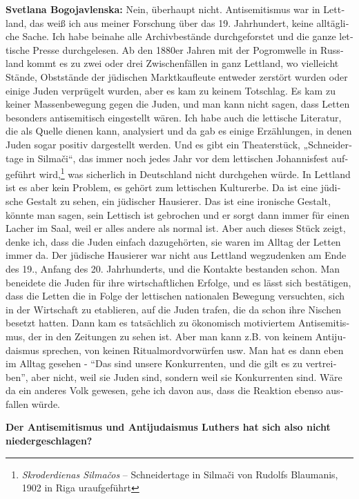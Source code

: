 \begin{otherlanguage}{ngerman}
\textbf{Svetlana Bogojavlenska:} Nein, überhaupt nicht. Antisemitismus war in Lettland, das weiß ich aus meiner Forschung über das 19. Jahrhundert, keine alltägliche Sache. Ich habe beinahe alle Archivbestände durchgeforstet und die ganze lettische Presse durchgelesen. Ab den 1880er Jahren mit der Pogromwelle in Russland kommt es zu zwei oder drei Zwischenfällen in ganz Lettland, wo vielleicht Stände, Obststände der jüdischen Marktkaufleute entweder zerstört wurden oder einige Juden verprügelt wurden, aber es kam zu keinem Totschlag. Es kam zu keiner Massenbewegung gegen die Juden, und man kann nicht sagen, dass Letten besonders antisemitisch eingestellt wären. Ich habe auch die lettische Literatur, die als Quelle dienen kann, analysiert und da gab es einige Erzählungen, in denen Juden sogar positiv dargestellt werden. Und es gibt ein Theaterstück, „Schneidertage in Silmači“, das immer noch jedes Jahr vor dem lettischen Johannisfest aufgeführt wird,\footnote{\textit{Skroderdienas Silmačos} – Schneidertage in Silmači von Rudolfs Blaumanis, 1902 in Riga uraufgeführt} was sicherlich in Deutschland nicht durchgehen würde. In Lettland ist es aber kein Problem, es gehört zum lettischen Kulturerbe. Da ist eine jüdische Gestalt zu sehen, ein jüdischer Hausierer. Das ist eine ironische Gestalt, könnte man sagen, sein Lettisch ist gebrochen und er sorgt dann immer für einen Lacher im Saal, weil er alles andere als normal ist. Aber auch dieses Stück zeigt, denke ich, dass die Juden einfach dazugehörten, sie waren im Alltag der Letten immer da. Der jüdische Hausierer war nicht aus Lettland wegzudenken am Ende des 19., Anfang des 20. Jahrhunderts, und die Kontakte bestanden schon. Man beneidete die Juden für ihre wirtschaftlichen Erfolge, und es lässt sich bestätigen, dass die Letten die in Folge der lettischen nationalen Bewegung versuchten, sich in der Wirtschaft zu etablieren, auf die Juden trafen, die da schon ihre Nischen besetzt hatten. Dann kam es tatsächlich zu ökonomisch motiviertem Antisemitismus, der in den Zeitungen zu sehen ist. Aber man kann z.B. von keinem Antijudaismus sprechen, von keinen Ritualmordvorwürfen usw. Man hat es dann eben im Alltag gesehen - "`Das sind unsere Konkurrenten, und die gilt es zu vertreiben"', aber nicht, weil sie Juden sind, sondern weil sie Konkurrenten sind. Wäre da ein anderes Volk gewesen, gehe ich davon aus, dass die Reaktion ebenso ausfallen würde.

\textbf{Der Antisemitismus und Antijudaismus Luthers hat sich also nicht niedergeschlagen?}


\end{otherlanguage}
